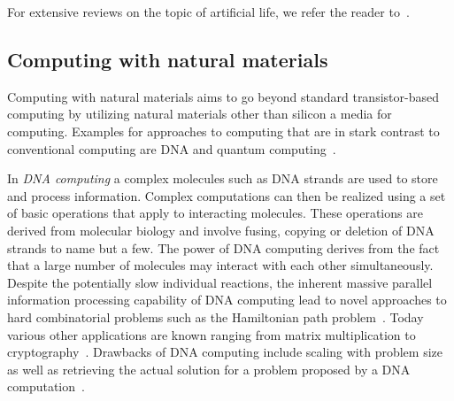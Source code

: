 		For extensive reviews on the topic of artificial life, we refer the reader to~\cite{Langton:1995:ALO:526815,Boden:1996:PAL:525139,bedau2000open,taylor1993artificial}.

	\subsection{Computing with natural materials}

		Computing with natural materials aims to go beyond standard transistor-based computing by utilizing natural materials other than silicon a media for computing. Examples for approaches to computing that are in stark contrast to conventional computing are DNA and quantum computing~\cite{de2007fundamentals}. 

		In \emph{DNA computing} a complex molecules such as DNA strands are used to store and process information. Complex computations can then be realized using a set of basic operations that apply to interacting molecules. These operations are derived from molecular biology and involve fusing, copying or deletion of DNA strands to name but a few. The power of DNA computing derives from the fact that a large number of molecules may interact with each other simultaneously. Despite the potentially slow individual reactions, the inherent massive parallel information processing capability of DNA computing lead to novel approaches to hard combinatorial problems such as the Hamiltonian path problem~\cite{adleman1994molecular}. Today various other applications are known ranging from matrix multiplication to cryptography~\cite{puaun2000computing,boneh1996computational,lipton1996breaking,oliver1998computation}. Drawbacks of DNA computing include scaling with problem size as well as retrieving the actual solution for a problem proposed by a DNA computation~\cite{de2007fundamentals}.

